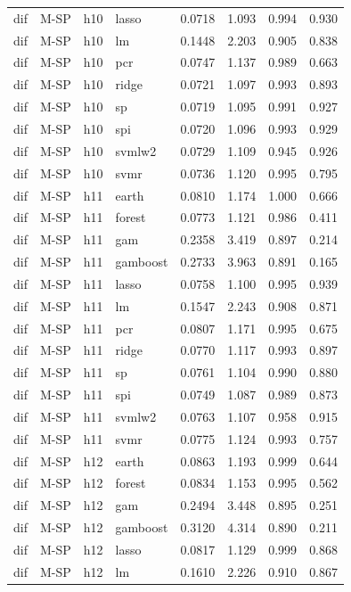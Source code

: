 \begin{ThreePartTable}
\begin{longtable}[t]{llclcccc}
dif & M-SP & h10 & lasso & 0.0718 & 1.093 & 0.994 & 0.930\\
dif & M-SP & h10 & lm & 0.1448 & 2.203 & 0.905 & 0.838\\
dif & M-SP & h10 & pcr & 0.0747 & 1.137 & 0.989 & 0.663\\
dif & M-SP & h10 & ridge & 0.0721 & 1.097 & 0.993 & 0.893\\
dif & M-SP & h10 & sp & 0.0719 & 1.095 & 0.991 & 0.927\\
dif & M-SP & h10 & spi & 0.0720 & 1.096 & 0.993 & 0.929\\
dif & M-SP & h10 & svmlw2 & 0.0729 & 1.109 & 0.945 & 0.926\\
dif & M-SP & h10 & svmr & 0.0736 & 1.120 & 0.995 & 0.795\\
\addlinespace
dif & M-SP & h11 & earth & 0.0810 & 1.174 & 1.000 & 0.666\\
dif & M-SP & h11 & forest & 0.0773 & 1.121 & 0.986 & 0.411\\
dif & M-SP & h11 & gam & 0.2358 & 3.419 & 0.897 & 0.214\\
dif & M-SP & h11 & gamboost & 0.2733 & 3.963 & 0.891 & 0.165\\
dif & M-SP & h11 & lasso & 0.0758 & 1.100 & 0.995 & 0.939\\
dif & M-SP & h11 & lm & 0.1547 & 2.243 & 0.908 & 0.871\\
dif & M-SP & h11 & pcr & 0.0807 & 1.171 & 0.995 & 0.675\\
dif & M-SP & h11 & ridge & 0.0770 & 1.117 & 0.993 & 0.897\\
dif & M-SP & h11 & sp & 0.0761 & 1.104 & 0.990 & 0.880\\
dif & M-SP & h11 & spi & 0.0749 & 1.087 & 0.989 & 0.873\\
dif & M-SP & h11 & svmlw2 & 0.0763 & 1.107 & 0.958 & 0.915\\
dif & M-SP & h11 & svmr & 0.0775 & 1.124 & 0.993 & 0.757\\
\addlinespace
dif & M-SP & h12 & earth & 0.0863 & 1.193 & 0.999 & 0.644\\
dif & M-SP & h12 & forest & 0.0834 & 1.153 & 0.995 & 0.562\\
dif & M-SP & h12 & gam & 0.2494 & 3.448 & 0.895 & 0.251\\
dif & M-SP & h12 & gamboost & 0.3120 & 4.314 & 0.890 & 0.211\\
dif & M-SP & h12 & lasso & 0.0817 & 1.129 & 0.999 & 0.868\\
dif & M-SP & h12 & lm & 0.1610 & 2.226 & 0.910 & 0.867\\

\end{longtable}
\end{ThreePartTable}
